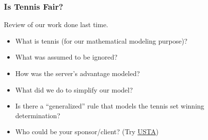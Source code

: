 \documentclass[hyperref={colorlinks=false},handout,10pt]{beamer}
\let\olditem\item
\renewcommand{\item}{\setlength{\itemsep}{0.5\baselineskip}\olditem}
\begin{document}
\begin{frame}
    \frametitle{Is Tennis Fair?}
    Review of our work done last time. 
    \begin{itemize}
        \item What is tennis (for our mathematical modeling purpose)? 
        \item What was assumed to be ignored? 
        \item How was the server's advantage modeled? 
        \item What did we do to simplify our model? 
        \item Is there a ``generalized'' rule that models the tennis set
            winning determination? 
        \item Who could be your sponsor/client? (Try \href{http://www.usta.com/About-USTA/?intloc=headernav}{USTA})
    \end{itemize}
\end{frame}


%

%
%
%
\end{document}
